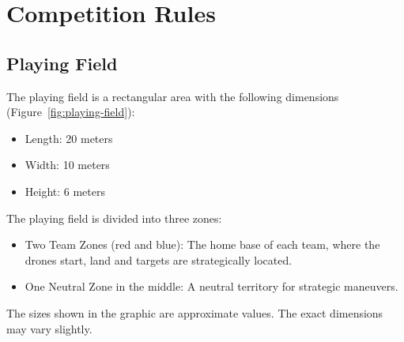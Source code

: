 
\section{Competition Rules}

\subsection{Playing Field}
The playing field is a rectangular area with the following dimensions (Figure~\ref{fig:playing-field}):
\begin{itemize}
	\item{Length: 20 meters}
	\item{Width: 10 meters}
	\item{Height: 6 meters}
\end{itemize}

The playing field is divided into three zones:
\begin{itemize}
	\item{Two Team Zones (red and blue): The home base of each team, where the drones start, land and targets are strategically located.}
	\item{One Neutral Zone in the middle: A neutral territory for strategic maneuvers.}
\end{itemize}
The sizes shown in the graphic are approximate values. The exact dimensions may vary slightly.

